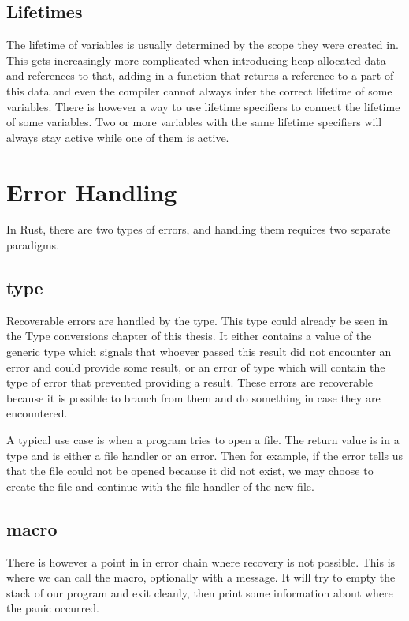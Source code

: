 \subsection{Lifetimes}

The lifetime of variables is usually determined by the scope they were created in. This gets increasingly more complicated when introducing heap-allocated data and references to that, adding in a function that returns a reference to a part of this data and even the compiler cannot always infer the correct lifetime of some variables. There is however a way to use lifetime specifiers to connect the lifetime of some variables. Two or more variables with the same lifetime specifiers will always stay active while one of them is active.

\section{Error Handling}

In Rust, there are two types of errors, and handling them requires two separate paradigms.

\subsection{ type}

Recoverable errors are handled by the  type. This type could already be seen in the Type conversions chapter of this thesis. It either contains a value of the generic  type which signals that whoever passed this result did not encounter an error and could provide some result, or an error of type  which will contain the type of error that prevented providing a result. These errors are recoverable because it is possible to branch from them and do something in case they are encountered.

A typical use case is when a program tries to open a file. The return value is in a  type and is either a file handler or an error. Then for example, if the error tells us that the file could not be opened because it did not exist, we may choose to create the file and continue with the file handler of the new file.

\subsection{ macro}

There is however a point in in error chain where recovery is not possible. This is where we can call the  macro, optionally with a message. It will try to empty the stack of our program and exit cleanly, then print some information about where the panic occurred.

